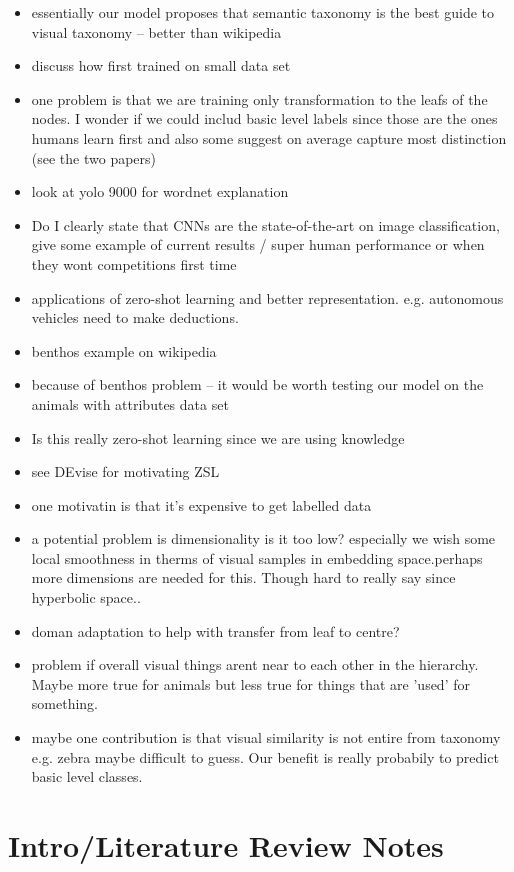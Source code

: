 \documentclass[12pt]{report}
\begin{document}
\begin{itemize}
  \item essentially our model proposes that semantic taxonomy is the best guide to visual taxonomy -- better than wikipedia 
    \item discuss how first trained on small data set
    \item one problem is that we are training only transformation to the leafs of the nodes. I wonder if we could includ basic level labels since those are the ones humans learn first and also some suggest on average capture most distinction (see the two papers)
    \item look at yolo 9000 for wordnet explanation
    \item Do I clearly state that CNNs are the state-of-the-art on image classification, give some example of current results / super human performance or when they wont competitions first time
    \item applications of zero-shot learning and better representation. e.g. autonomous vehicles need to make deductions. 
    \item benthos example on wikipedia
    \item because of benthos problem -- it would be worth testing our model on the animals with attributes data set 
    \item Is this really zero-shot learning since we are using knowledge
    \item see DEvise for motivating ZSL
    \item one motivatin is that it's expensive to get labelled data
    \item a potential problem is dimensionality is it too low? especially we wish some local smoothness in therms of visual samples in embedding space.perhaps more dimensions are needed for this. Though hard to really say since hyperbolic space..
    \item doman adaptation to help with transfer  from leaf to centre?
    \item problem if overall visual things arent near to each other in the hierarchy. Maybe more true for animals but less true for things that are 'used' for something.
    \item maybe one contribution is that visual similarity is not entire from taxonomy e.g. zebra maybe difficult to guess. Our benefit is really probabily to predict basic level classes. 
\end{itemize}

\chapter{Intro/Literature Review Notes}
\end{document}
